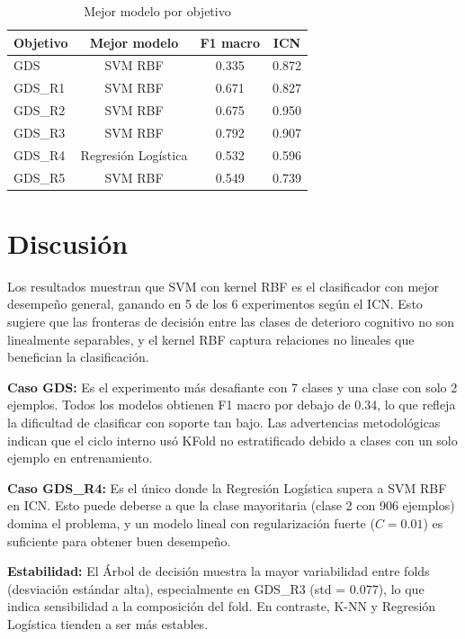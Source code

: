 \documentclass[conference]{IEEEtran}
\begin{document}
\begin{table}[h]
\centering
\caption{Mejor modelo por objetivo}
\label{tab:resumen}
\begin{tabular}{lccc}
\toprule
\textbf{Objetivo} & \textbf{Mejor modelo} & \textbf{F1 macro} & \textbf{ICN} \\
\midrule
GDS & SVM RBF & 0.335 & 0.872 \\
GDS\_R1 & SVM RBF & 0.671 & 0.827 \\
GDS\_R2 & SVM RBF & 0.675 & 0.950 \\
GDS\_R3 & SVM RBF & 0.792 & 0.907 \\
GDS\_R4 & Regresión Logística & 0.532 & 0.596 \\
GDS\_R5 & SVM RBF & 0.549 & 0.739 \\
\bottomrule
\end{tabular}
\end{table}

\section{Discusión}

Los resultados muestran que SVM con kernel RBF es el clasificador con mejor desempeño general, ganando en 5 de los 6 experimentos según el ICN. Esto sugiere que las fronteras de decisión entre las clases de deterioro cognitivo no son linealmente separables, y el kernel RBF captura relaciones no lineales que benefician la clasificación.

\noindent \textbf{Caso GDS:} Es el experimento más desafiante con 7 clases y una clase con solo 2 ejemplos. Todos los modelos obtienen F1 macro por debajo de 0.34, lo que refleja la dificultad de clasificar con soporte tan bajo. Las advertencias metodológicas indican que el ciclo interno usó KFold no estratificado debido a clases con un solo ejemplo en entrenamiento.

\noindent \textbf{Caso GDS\_R4:} Es el único donde la Regresión Logística supera a SVM RBF en ICN. Esto puede deberse a que la clase mayoritaria (clase 2 con 906 ejemplos) domina el problema, y un modelo lineal con regularización fuerte (\(C = 0.01\)) es suficiente para obtener buen desempeño.

\noindent \textbf{Estabilidad:} El Árbol de decisión muestra la mayor variabilidad entre folds (desviación estándar alta), especialmente en GDS\_R3 (std = 0.077), lo que indica sensibilidad a la composición del fold. En contraste, K-NN y Regresión Logística tienden a ser más estables.
\end{document}
